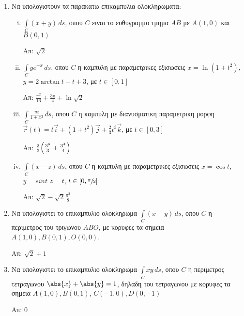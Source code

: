 


\everymath{\displaystyle}



\begin{center}
\end{center}

\vspace{\baselineskip}

\begin{enumerate} 

\item Να υπολογιστουν τα παρακατω επικαμπυλια ολοκληρωματα:

\begin{enumerate}[i)]

\item $\int\limits_C (x+y)\,ds$, οπου $C$ ειναι το ευθυγραμμο τμημα $ΑΒ$ με $A(1,0)$ και $B(0,1)$

\hfill Απ: $\sqrt{2}$



\item $\int\limits_C ye^{-x}\,ds$, οπου $C$ η καμπυλη με παραμετρικες εξισωσεις $x=\ln(1+t^2)$, $y=2\arctan t-t+3$, με $t\in [0,1]$


\hfill Απ: $\frac{\pi^2}{16}+\frac{3\pi}{4}+\ln\sqrt{2}$

\item $\int\limits_C \frac{yz}{1+x^2}\,ds$, οπου $C$ η καμπυλη με διανυσματικη παραμετρικη μορφη $\vec{r}(t)=t\vec{i}+(1+t^2)\vec{j}+\frac{2}{3}t^3\vec{k}$, με $t\in [0,3]$

\hfill Απ: $\frac{2}{3}\Bigl(\frac{3^6}{3}+\frac{3^4}{4}\Bigr)$


\item $\int\limits_C (x-z)\,ds$, οπου $C$ η καμπυλη με παραμετρικες εξισωσεις $x=\cos t$, $y=sin t$ $z=t$, $t\in[0,\sfrac{\pi}{2}]$

\hfill Απ: $\sqrt{2}-\sqrt{2}\frac{\pi^2}{8}$



\end{enumerate}

\item Να υπολογιστει το επικαμπυλιο ολοκληρωμα $\int\limits_C (x+y)\,ds$, οπου $C$ η περιμετρος του τριγωνου $ΑΒΟ$, με κορυφες τα σημεια $A(1,0), B(0,1), O(0,0)$.

\hfill Απ: $\sqrt{2}+1$



\item Να υπολογιστει το επικαμπυλιο ολοκληρωμα $\int\limits_C xy\,ds$, οπου $C$ η περιμετρος τετραγωνου $\abs{x}+\abs{y}=1$, δηλαδη του τετραγωνου με κορυφες τα σημεια $A(1,0), B(0,1)$, $C(-1,0), D(0,-1)$

\hfill Απ: $0$

\end{enumerate}


